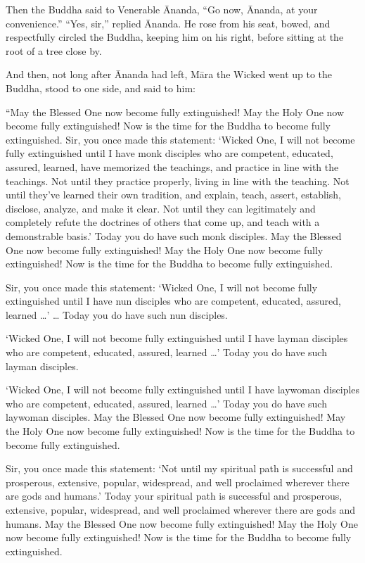 \documentclass[12pt,openany]{book}%
\begin{document}
Then the Buddha said to Venerable Ānanda, “Go now, Ānanda, at your convenience.” “Yes, sir,” replied Ānanda. He rose from his seat, bowed, and respectfully circled the Buddha, keeping him on his right, before sitting at the root of a tree close by. 

And then, not long after Ānanda had left, \textsanskrit{Māra} the Wicked went up to the Buddha, stood to one side, and said to him: 

“May the Blessed One now become fully extinguished! May the Holy One now become fully extinguished! Now is the time for the Buddha to become fully extinguished. Sir, you once made this statement: ‘Wicked One, I will not become fully extinguished until I have monk disciples who are competent, educated, assured, learned, have memorized the teachings, and practice in line with the teachings. Not until they practice properly, living in line with the teaching. Not until they’ve learned their own tradition, and explain, teach, assert, establish, disclose, analyze, and make it clear. Not until they can legitimately and completely refute the doctrines of others that come up, and teach with a demonstrable basis.’ Today you do have such monk disciples. May the Blessed One now become fully extinguished! May the Holy One now become fully extinguished! Now is the time for the Buddha to become fully extinguished. 

Sir, you once made this statement: ‘Wicked One, I will not become fully extinguished until I have nun disciples who are competent, educated, assured, learned …’ … Today you do have such nun disciples. 

‘Wicked One, I will not become fully extinguished until I have layman disciples who are competent, educated, assured, learned …’ Today you do have such layman disciples. 

‘Wicked One, I will not become fully extinguished until I have laywoman disciples who are competent, educated, assured, learned …’ Today you do have such laywoman disciples. May the Blessed One now become fully extinguished! May the Holy One now become fully extinguished! Now is the time for the Buddha to become fully extinguished. 

Sir, you once made this statement: ‘Not until my spiritual path is successful and prosperous, extensive, popular, widespread, and well proclaimed wherever there are gods and humans.’ Today your spiritual path is successful and prosperous, extensive, popular, widespread, and well proclaimed wherever there are gods and humans. May the Blessed One now become fully extinguished! May the Holy One now become fully extinguished! Now is the time for the Buddha to become fully extinguished. 
\end{document}
